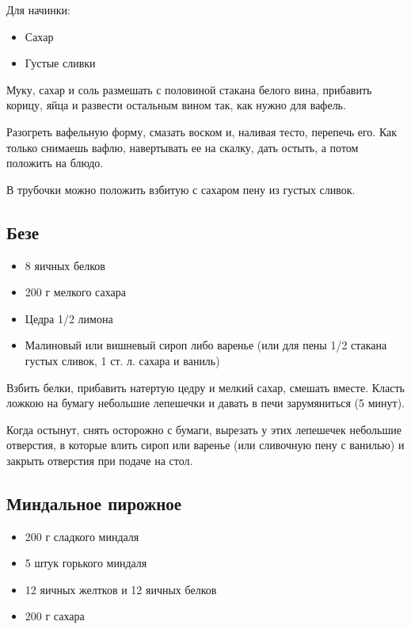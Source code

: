Для начинки: 

\begin{itemize}
	\item Сахар 
    \item Густые сливки
\end{itemize}

Муку, сахар и соль размешать с половиной стакана белого вина, прибавить корицу, яйца и развести остальным вином так, как нужно для вафель.

Разогреть вафельную форму, смазать воском и, наливая тесто, перепечь его. Как только снимаешь вафлю, навертывать ее на скалку, дать остыть, а потом положить на блюдо.

В трубочки можно положить взбитую с сахаром пену из густых сливок.

\subsection{Безе}

\begin{itemize}
	\item 8 яичных белков 
    \item 200 г мелкого сахара 
    \item Цедра 1/2 лимона
    \item Малиновый или вишневый сироп либо варенье (или для пены 1/2 стакана густых сливок, 1 ст. л. сахара и ваниль)
\end{itemize}

Взбить белки, прибавить натертую цедру и мелкий сахар, смешать вместе. Класть ложкою на бумагу небольшие лепешечки и давать в печи зарумяниться (5 минут).

Когда остынут, снять осторожно с бумаги, вырезать у этих лепешечек небольшие отверстия, в которые влить сироп или варенье (или сливочную пену с ванилью) и закрыть отверстия при подаче на стол.

\subsection{Миндальное пирожное}

\begin{itemize}
	\item 200 г сладкого миндаля 
    \item 5 штук горького миндаля
    \item 12 яичных желтков и 12 яичных белков
    \item 200 г сахара
\end{itemize}

